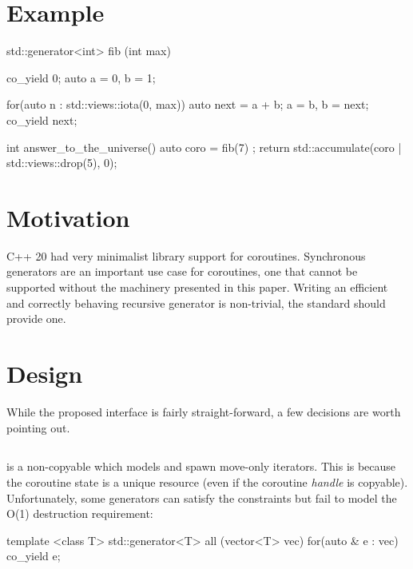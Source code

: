 \documentclass{wg21}
\begin{document}
\section{Example}

\begin{colorblock}
    std::generator<int> fib (int max) {
        co_yield 0;
        auto a = 0, b = 1;

        for(auto n : std::views::iota(0, max))  {
            auto next = a + b;
            a = b, b = next;
            co_yield next;
        }
    }

    int answer_to_the_universe() {
        auto coro = fib(7) ;
        return std::accumulate(coro | std::views::drop(5), 0);
    }

\end{colorblock}

\section{Motivation}

C++ 20 had very minimalist library support for coroutines.
Synchronous generators are an important use case for coroutines, one that cannot be supported without
the machinery presented in this paper.
Writing an efficient and correctly behaving recursive generator is non-trivial, the standard should provide one.


\section{Design}

While the proposed  interface is fairly straight-forward, a few decisions are worth pointing out.

\subsection{}

 is a non-copyable  which models  and spawn move-only iterators.
This is because the coroutine state is a unique resource (even if the coroutine \textit{handle} is copyable).
Unfortunately, some generators can satisfy the  constraints but fail to model the  O(1)
destruction requirement:

\begin{colorblock}

    template <class T>
    std::generator<T> all (vector<T> vec) {
        for(auto & e : vec)  {
            co_yield e;
        }
    }

\end{colorblock}
\end{document}
